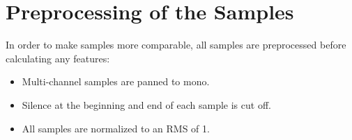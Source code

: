 \section{Preprocessing of the Samples}
\label{sec:Preprocessing}

In order to make samples more comparable, all samples are preprocessed before calculating any features:
\begin{itemize}
  \item Multi-channel samples are panned to mono.
  \item Silence at the beginning and end of each sample is cut off.
  \item All samples are normalized to an RMS of 1.
\end{itemize}